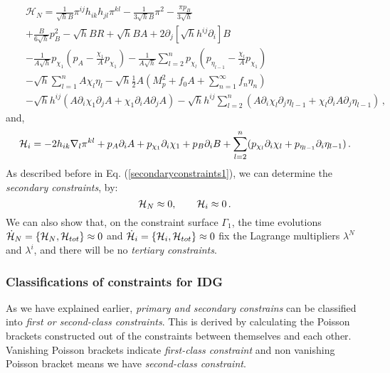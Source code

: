\documentclass[a4paper,12pt]{article}
\newcommand{\la}{\lambda}
\newcommand{\Ga}{\Gamma}
\newcommand{\cH}{{\cal H}}
\newcommand{\+}{^{\dagger}}
\newcommand{\2}{\frac{1}{2}}
\newcommand{\3}{\frac{1}{3}}
\newcommand{\4}{\frac{1}{4}}
\newcommand{\6}{\frac{1}{6}}
\newcommand{\8}{\frac{1}{8}}
\begin{document}
\begin{eqnarray}\label{Hamilton-IDG1}
&&\mathcal{H}_{N}=\frac{1}{\sqrt{h}B}\pi^{ij}h_{ik}h_{jl}\pi^{kl}-\frac{1}{3\sqrt{h}B}\pi^2-\frac{\pi
p_B}{3\sqrt{h}}\\\nonumber&&+\frac{B}{6\sqrt{h}}p_B^{2}-\sqrt{h}BR+\sqrt{h}BA+2\partial_j[\sqrt{h}h^{ij}\partial_i]B\\\nonumber
&&-\frac{1}{A\sqrt{h}}p_{\chi_{1}}(p_A-\frac{\chi_1}{A}p_{\chi_1})-\frac{1}{A\sqrt{h}}\sum^{n}_{l=2}p_{\chi_{l}}(p_{\eta_{l-1}}-\frac{\chi_{l}}{A}p_{\chi_{1}})\\\nonumber
&&-\sqrt{h}\sum^{n}_{l=1}A\chi_l\eta_l-\sqrt{h}\frac{1}{2}A(M^{2}_{p}+f_{0}A+\sum^{\infty}_{n=1}f_n\eta_{n})\\\nonumber
&&-\sqrt{h}h^{ij}(A\partial_i\chi_1  \partial_j A+\chi_1
\partial_i A
\partial_j A)-\sqrt{h}h^{ij}\sum^{n}_{l=2}(A\partial_i\chi_l  \partial_j\eta_{l-1}
+\chi_l
\partial_i A
\partial_j \eta_{l-1})\,,
\end{eqnarray}
and, 
\begin{eqnarray}\label{Hamilton-IDG2}
\cH_i=-2h_{ik}
\nabla_l\pi^{kl}+p_A\partial_iA+p_{\chi_1}\partial_i\chi_1+p_B\partial_iB+\sum^{n}_{l=2}(p_{\chi_l}\partial_i\chi_l+p_{\eta_{l-1}}\partial_i\eta_{l-1})\,.
\nonumber\\
\end{eqnarray}
As described before in Eq. (\ref{secondaryconstraints1}), we can determine the
{\it secondary constraints},  by: 
\begin{equation}
\mathcal{H}_{N}\approx0,\quad \quad \cH_{i}\approx0\,.
\end{equation}
We can also show that, on the constraint surface $\Ga_1$, the time evolutions $\dot \cH_{N}=\{\cH_{N},\mathcal{H}_{tot}\}\approx0$ and $\dot \cH_i=\{\cH_{i},\mathcal{H}_{tot}\}\approx0$ fix the Lagrange multipliers $\la^N$ and $\la^i$,  and there will be no 
{\it tertiary constraints}.


\subsubsection{Classifications of constraints for IDG } 
 
 As we have explained earlier, {\it primary and secondary constrains} can be classified into {\it first or second-class constraints}. This is  derived by calculating the Poisson brackets constructed out of the constraints between themselves and each other. Vanishing Poisson brackets indicate {\it first-class constraint} and non vanishing Poisson bracket means we have {\it second-class constraint}. 
 
\end{document}
